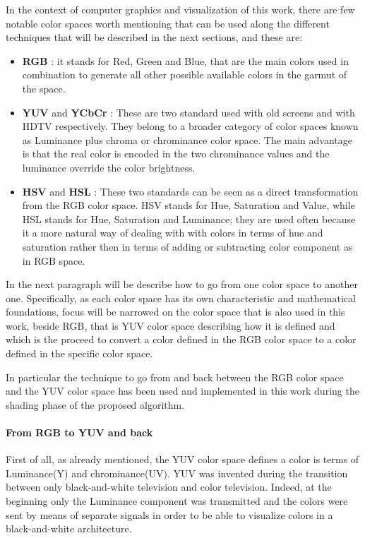 \documentclass[12pt,a4paper]{extarticle}
\begin{document}
In the context of computer graphics and visualization of this work, there are few notable color spaces worth mentioning that can be used along the different techniques that will be described in the next sections, and these are:
\begin{itemize}
\item \textbf{RGB} : it stands for Red, Green and Blue, that are the main colors used in combination to generate all other possible available colors in the garmut of the space.
\item \textbf{YUV} and \textbf{YCbCr} : These are two standard used with old screens and with HDTV respectively. They belong to a broader category of color spaces known as Luminance plus chroma or chrominance color space. The main advantage is that the real color is encoded in the two chrominance values and the luminance override the color brightness.
\item \textbf{HSV} and \textbf{HSL} : These two standards can be seen as a direct transformation from the RGB color space. HSV stands for Hue, Saturation and Value, while HSL stands for Hue, Saturation and Luminance; they are used often because it a more natural way of dealing with with colors in terms of hue and saturation rather then in terms of adding or subtracting color component as in RGB space.
\end{itemize}
In the next paragraph will be describe how to go from one color space to another one. Specifically, as each color space has its own characteristic and mathematical foundations, focus will be narrowed on the color space that is also used in this work, beside RGB, that is YUV color space describing how it is defined and which is the proceed to convert a color defined in the RGB color space to a color defined in the specific color space.


In particular the technique to go from and back between the RGB color space and the YUV color space has been used and implemented in this work during the shading phase of the proposed algorithm.
\paragraph{From RGB to YUV and back} First of all, as already mentioned, the YUV color space defines a color is terms of Luminance(Y) and chrominance(UV). YUV was invented during the transition between only black-and-white television and color television. Indeed, at the beginning only the Luminance component was transmitted and the colors were sent by means of separate signals in order to be able to visualize colors in a black-and-white architecture.
\end{document}
